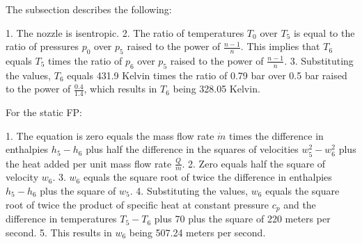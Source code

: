 The subsection describes the following:

1. The nozzle is isentropic.
2. The ratio of temperatures \( T_0 \) over \( T_5 \) is equal to the ratio of pressures \( p_0 \) over \( p_5 \) raised to the power of \( \frac{n-1}{n} \). This implies that \( T_6 \) equals \( T_5 \) times the ratio of \( p_6 \) over \( p_5 \) raised to the power of \( \frac{n-1}{n} \).
3. Substituting the values, \( T_6 \) equals 431.9 Kelvin times the ratio of 0.79 bar over 0.5 bar raised to the power of \( \frac{0.4}{1.4} \), which results in \( T_6 \) being 328.05 Kelvin.

For the static FP:

1. The equation is zero equals the mass flow rate \( \dot{m} \) times the difference in enthalpies \( h_5 - h_6 \) plus half the difference in the squares of velocities \( w_5^2 - w_6^2 \) plus the heat added per unit mass flow rate \( \frac{Q}{\dot{m}} \).
2. Zero equals half the square of velocity \( w_6 \).
3. \( w_6 \) equals the square root of twice the difference in enthalpies \( h_5 - h_6 \) plus the square of \( w_5 \).
4. Substituting the values, \( w_6 \) equals the square root of twice the product of specific heat at constant pressure \( c_p \) and the difference in temperatures \( T_5 - T_6 \) plus 70 plus the square of 220 meters per second.
5. This results in \( w_6 \) being 507.24 meters per second.